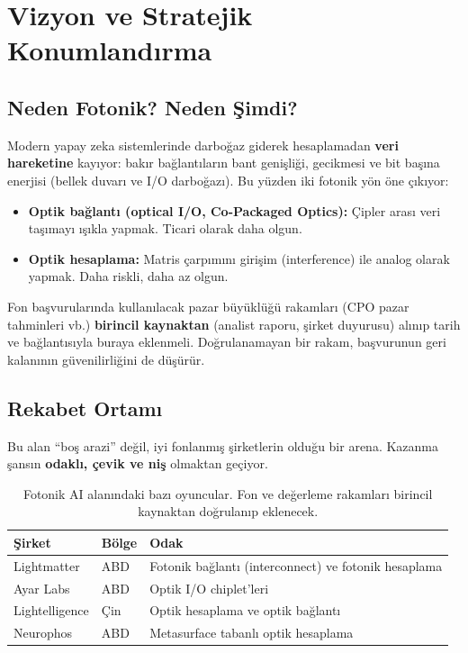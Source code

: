 \documentclass[11pt,a4paper]{article}
\begin{document}
\section{Vizyon ve Stratejik Konumlandırma}

\subsection{Neden Fotonik? Neden Şimdi?}

Modern yapay zeka sistemlerinde darboğaz giderek hesaplamadan \textbf{veri hareketine} kayıyor: bakır bağlantıların bant genişliği, gecikmesi ve bit başına enerjisi (bellek duvarı ve I/O darboğazı). Bu yüzden iki fotonik yön öne çıkıyor:

\begin{itemize}
    \item \textbf{Optik bağlantı (optical I/O, Co-Packaged Optics):} Çipler arası veri taşımayı ışıkla yapmak. Ticari olarak daha olgun.
    \item \textbf{Optik hesaplama:} Matris çarpımını girişim (interference) ile analog olarak yapmak. Daha riskli, daha az olgun.
\end{itemize}

\begin{notebox}
Fon başvurularında kullanılacak pazar büyüklüğü rakamları (CPO pazar tahminleri vb.) \textbf{birincil kaynaktan} (analist raporu, şirket duyurusu) alınıp tarih ve bağlantısıyla buraya eklenmeli. Doğrulanamayan bir rakam, başvurunun geri kalanının güvenilirliğini de düşürür.
\end{notebox}

\subsection{Rekabet Ortamı}

\begin{warnbox}
Bu alan ``boş arazi'' değil, iyi fonlanmış şirketlerin olduğu bir arena. Kazanma şansın \textbf{odaklı, çevik ve niş} olmaktan geçiyor.
\end{warnbox}

\begin{table}[h!]
\centering
\small
\begin{tabular}{@{}p{3cm}p{2cm}p{9cm}@{}}
\toprule
\textbf{Şirket} & \textbf{Bölge} & \textbf{Odak} \\
\midrule
Lightmatter & ABD & Fotonik bağlantı (interconnect) ve fotonik hesaplama \\
Ayar Labs & ABD & Optik I/O chiplet'leri \\
Lightelligence & Çin & Optik hesaplama ve optik bağlantı \\
Neurophos & ABD & Metasurface tabanlı optik hesaplama \\
\bottomrule
\end{tabular}
\caption{Fotonik AI alanındaki bazı oyuncular. Fon ve değerleme rakamları birincil kaynaktan doğrulanıp eklenecek.}
\end{table}
\end{document}
